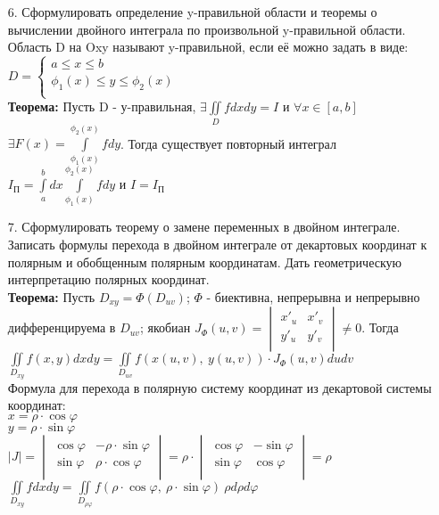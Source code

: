 \documentclass[a4paper]{article}
\begin{document}
\begin{enumerate}
\item[6.] Сформулировать определение y-правильной области и теоремы о вычислении двойного интеграла по произвольной y-правильной области. \\

Область D на Oxy называют y-правильной, если её можно задать в виде: $D =  
\begin{cases}
	a \leqslant x \leqslant b \\
	\phi_1(x) \leqslant y \leqslant \phi_2(x) \\
\end{cases}$ \\
\textbf{Теорема:} Пусть D - у-правильная, $\displaystyle  \exists \iint\limits_{D} f dxdy = I$ и $\forall x \in [a,b]$ $\displaystyle  \exists F(x) = \int\limits_{\phi_1(x)}^{\phi_2(x)} f dy$. Тогда существует повторный интеграл $\displaystyle  I_\text{П} = \int\limits_{a}^{b} dx \int\limits_{\phi_1(x)}^{\phi_2(x)} f dy$ и $I = I_\text{П}$ \\


\item[7.] Сформулировать теорему о замене переменных в двойном интеграле. Записать формулы перехода в двойном интеграле от декартовых координат к полярным и обобщенным полярным координатам. Дать геометрическую интерпретацию полярных координат. \\

\textbf{Теорема:} Пусть $D_{xy} = \Phi(D_{uv})$; $\Phi$ - биективна, непрерывна и непрерывно дифференцируема в $D_{uv}$; якобиан $J_{\Phi} (u,v) = 
\begin{vmatrix}
	x'_u & x'_v \\
	y'_u & y'_v \\
\end{vmatrix} \neq 0$.
Тогда $\displaystyle   \iint\limits_{D_{xy}} f(x,y) dxdy = \iint\limits_{D_{uv}} f \left( x(u,v), \ y(u,v) \right) \cdot  J_\Phi (u,v) dudv$ \\
Формула для перехода в полярную систему координат из декартовой системы координат: \\
$x = \rho \cdot \cos{\varphi}$ \\
$y = \rho \cdot \sin{\varphi}$ \\
$|J| = 
\begin{vmatrix}
	\cos{\varphi} & -\rho \cdot \sin{\varphi} \\
	\sin{\varphi} & \rho \cdot \cos{\varphi} \\
\end{vmatrix} = \rho \cdot 
\begin{vmatrix}
	\cos{\varphi} & -\sin{\varphi} \\
	\sin{\varphi} & \cos{\varphi} \\
\end{vmatrix} = \rho$ \\
$\displaystyle  \iint\limits_{D_{xy}} f dxdy = \iint\limits_{D_{\rho \varphi}} f ( \rho \cdot \cos{\varphi}, \ \rho \cdot \sin{\varphi} ) \ \rho d\rho d\varphi$ \\



\end{enumerate}
\end{document}
